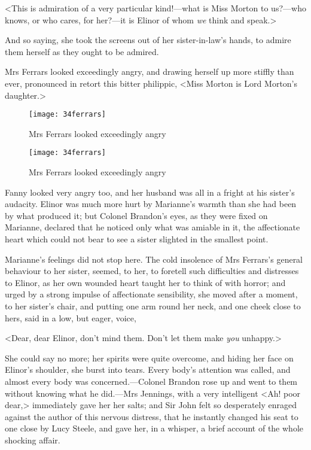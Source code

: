 <This is admiration of a very particular kind!—what is Miss Morton to us?—who knows, or who cares, for her?—it is Elinor of whom \textit{we} think and speak.>

And so saying, she took the screens out of her sister-in-law's hands, to admire them herself as they ought to be admired.

Mrs Ferrars looked exceedingly angry, and drawing herself up more stiffly than ever, pronounced in retort this bitter philippic, <Miss Morton is Lord Morton's daughter.>

\begin{a4}
	\begin{figure}[tbph]
		\centering
		\texttt{[image: 34ferrars]}
		\caption{Mrs Ferrars looked exceedingly angry}
	\end{figure}
\end{a4}

\begin{letter}
	\begin{figure}[tbph]
		\centering
		\texttt{[image: 34ferrars]}
		\caption{Mrs Ferrars looked exceedingly angry}
	\end{figure}
\end{letter}

Fanny looked very angry too, and her husband was all in a fright at his sister's audacity. Elinor was much more hurt by Marianne's warmth than she had been by what produced it; but Colonel Brandon's eyes, as they were fixed on Marianne, declared that he noticed only what was amiable in it, the affectionate heart which could not bear to see a sister slighted in the smallest point.

Marianne's feelings did not stop here. The cold insolence of Mrs Ferrars's general behaviour to her sister, seemed, to her, to foretell such difficulties and distresses to Elinor, as her own wounded heart taught her to think of with horror; and urged by a strong impulse of affectionate sensibility, she moved after a moment, to her sister's chair, and putting one arm round her neck, and one cheek close to hers, said in a low, but eager, voice,

<Dear, dear Elinor, don't mind them. Don't let them make \textit{you} unhappy.>

She could say no more; her spirits were quite overcome, and hiding her face on Elinor's shoulder, she burst into tears. Every body's attention was called, and almost every body was concerned.—Colonel Brandon rose up and went to them without knowing what he did.—Mrs Jennings, with a very intelligent <Ah! poor dear,> immediately gave her her salts; and Sir John felt so desperately enraged against the author of this nervous distress, that he instantly changed his seat to one close by Lucy Steele, and gave her, in a whisper, a brief account of the whole shocking affair.

